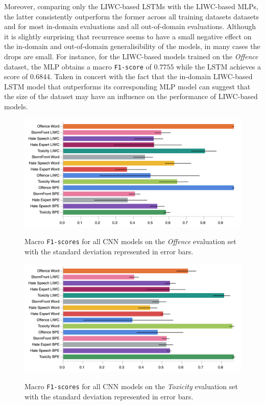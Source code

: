 Moreover, comparing only the LIWC-based LSTMs with the LIWC-based MLPs, the latter consistently outperform the former across all training datasets datasets and for most in-domain evaluations and all out-of-domain evaluations.
Although it is slightly surprising that recurrence seems to have a small negative effect on the in-domain and out-of-domain generalisibility of the models, in many cases the drops are small.
For instance, for the LIWC-based models trained on the \textit{Offence} dataset, the MLP obtains a macro \texttt{F1-score} of $0.7755$ while the LSTM achieves a score of $0.6844$.
Taken in concert with the fact that the in-domain LIWC-based LSTM model that outperforms its corresponding MLP model can suggest that the size of the dataset may have an influence on the performance of LIWC-based models.

\begin{figure}
\begin{minipage}{\textwidth}
\centering
    \includegraphics[width=\textwidth]{all_cnn_davidson_test.pdf}
    \caption{Macro \texttt{F1-scores} for all CNN models on the \textit{Offence} evaluation set with the standard deviation represented in error bars.}
    \label{fig:davidson_cnn_test}
    \vfill
    \includegraphics[width=\textwidth]{all_cnn_wulczyn_test.pdf}
    \caption{Macro \texttt{F1-scores} for all CNN models on the \textit{Toxicity} evaluation set with the standard deviation represented in error bars.}
    \label{fig:wulczyn_cnn_test}
  \end{minipage}
\end{figure}

